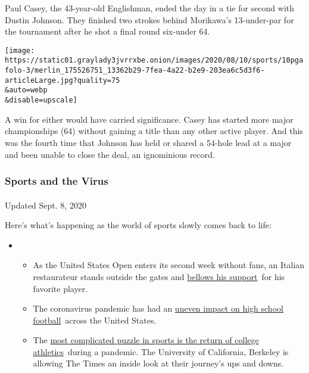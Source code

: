Paul Casey, the 43-year-old Englishman, ended the day in a tie for
second with Dustin Johnson. They finished two strokes behind Morikawa's
13-under-par for the tournament after he shot a final round six-under
64.

\texttt{[image: https://static01.graylady3jvrrxbe.onion/images/2020/08/10/sports/10pgafolo-3/merlin\_175526751\_13362b29-7fea-4a22-b2e9-203ea6c5d3f6-articleLarge.jpg?quality=75\\\&auto=webp\\\&disable=upscale]}

A win for either would have carried significance. Casey has started more
major championships (64) without gaining a title than any other active
player. And this was the fourth time that Johnson has held or shared a
54-hole lead at a major and been unable to close the deal, an
ignominious record.

\hypertarget{sports-and-the-virus}{%
\subsubsection{Sports and the Virus}\label{sports-and-the-virus}}

\paragraph{}

Updated Sept. 8, 2020

Here's what's happening as the world of sports slowly comes back to
life:

\begin{itemize}
\item
  \begin{itemize}
  \tightlist
  \item
    As the United States Open enters its second week without fans, an
    Italian restaurateur stands outside the gates and
    \href{https://www.nytimes3xbfgragh.onion/2020/09/06/sports/tennis/US-Open-Matteo-Berrettini-fan.html?action=click\&pgtype=Article\&state=default\&region=MAIN_CONTENT_2\&context=storylines_keepup}{bellows
    his support}~for his favorite player.
  \item
    The coronavirus pandemic has had an
    \href{https://www.nytimes3xbfgragh.onion/2020/09/03/sports/ncaafootball/high-school-football-coronavirus-pandemic.html?action=click\&pgtype=Article\&state=default\&region=MAIN_CONTENT_2\&context=storylines_keepup}{uneven
    impact on high school football}~across the United States.
  \item
    The
    \href{https://www.nytimes3xbfgragh.onion/2020/09/02/sports/ncaafootball/coronavirus-cal-athletics-season.html?action=click\&pgtype=Article\&state=default\&region=MAIN_CONTENT_2\&context=storylines_keepup}{most
    complicated puzzle in sports is the return of college
    athletics}~during a pandemic. The University of California, Berkeley
    is allowing The Times an inside look at their journey's ups and
    downs.
  \end{itemize}
\end{itemize}

